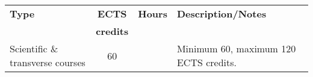 \begin{table}[h!]
  \centering
  \footnotesize
    \begin{tabularx}{\textwidth}{p{}ccX}
    \toprule
  \textbf{Type} & \textbf{ECTS}&\textbf{Hours}&\textbf{Description/Notes} \\
  & \textbf{credits}&&\\
    \midrule
   Scientific \& transverse courses&60&&Minimum 60, maximum 120 ECTS credits.\\
    \bottomrule
    \end{tabularx}%
  \label{tab:lulea_tab}%
\end{table}%